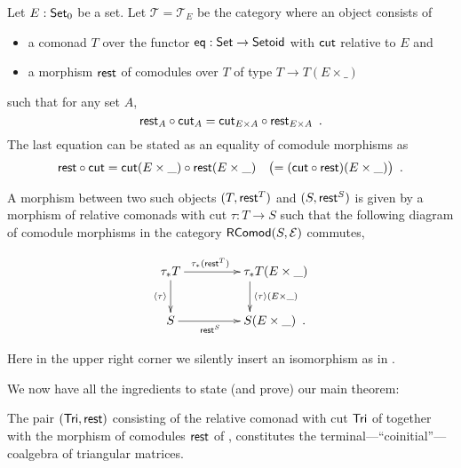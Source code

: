 \documentclass[conference,10pt]{IEEEtran}
\begin{document}
\begin{definition}\label{def:cat_tri}
   Let $E:\mathsf{Set}_0$ be a set.
   Let $\mathcal{T} = \mathcal{T}_E$ be the category where an object consists of
   \begin{itemize}
    \item a comonad $T$ over the functor $\mathsf{eq}:\mathsf{Set}\to\mathsf{Setoid}$ with $\mathsf{cut}$ relative to $E$ and
    \item a morphism $\mathsf{rest}$ of comodules over $T$ of type $T \to T(E\times \_)$
   \end{itemize}
   such that for any set $A$,
    \[ {\mathsf{rest}_A} \circ {\ensuremath{\mathsf{cut}}_A} = {\mathsf{cut}_{E\times A}} \circ {\ensuremath{\mathsf{rest}}_{E\times A}} \enspace . \]
   The last equation can be stated as an equality of comodule morphisms as
     \[ {\mathsf{rest}} \circ {\ensuremath{\mathsf{cut}}} = {\mathsf{cut}(E\times\_)} \circ {\ensuremath{\mathsf{rest}}(E\times \_)} \quad \bigl( = ({\mathsf{cut}} \circ {\ensuremath{\mathsf{rest}}})(E\times \_)\bigr)\enspace . \]

  
   
   A morphism between two such objects $(T,\mathsf{rest}^T)$ and $(S,\mathsf{rest}^S)$
   is given by a morphism of relative comonads with cut $\tau : T \to S$ such that
   the following diagram of comodule morphisms in the category $\mathsf{RComod}(S,\mathcal{E})$ commutes,
   
   \[ \begin{xy}
       \xymatrix{   \tau_*T  \ar[r]^{\tau_*(\tail^T)} \ar[d]_{\induced{\tau}}  &  **[r] \tau_*T (E\times \_ )\ar[d]^{\induced{\tau}(E\times \_)} \\
                    S  \ar[r]_{\tail^S}  &  **[r] S (E\times \_ ) \enspace .
        }
      \end{xy}
   \]

   \noindent
   Here in the upper right corner we silently insert an isomorphism as in .
\end{definition}   
   
We now have all the ingredients to state (and prove) our main theorem:
\begin{theorem}\label{ex:final_sem_tri} %
   The pair $(\mathsf{Tri}, \mathsf{rest})$ consisting of the relative comonad with cut $\mathsf{Tri}$ of  together with 
    the morphism of comodules $\mathsf{rest}$ of ,
   constitutes the terminal---\enquote{coinitial}---coalgebra of triangular matrices.
\end{theorem}
\end{document}
